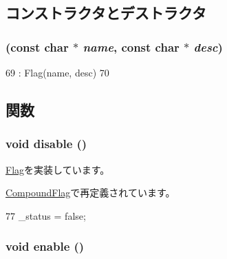 \subsection{コンストラクタとデストラクタ}
\hypertarget{classDebug_1_1SimpleFlag_a8a90f1268b2771315497edeecc402040}{
\subsubsection[{SimpleFlag}]{ (const char $\ast$ {\em name}, \/  const char $\ast$ {\em desc})}}
\label{classDebug_1_1SimpleFlag_a8a90f1268b2771315497edeecc402040}



\begin{DoxyCode}
69         : Flag(name, desc)
70     { }
\end{DoxyCode}


\subsection{関数}
\hypertarget{classDebug_1_1SimpleFlag_a8cfbbe53c1cf6e3054736daea3044c0f}{
\subsubsection[{disable}]{\setlength{\rightskip}{0pt plus 5cm}void disable ()}}
\label{classDebug_1_1SimpleFlag_a8cfbbe53c1cf6e3054736daea3044c0f}


\hyperlink{classDebug_1_1Flag_ac79a817a699d8fb54e52bf6895db1b0d}{Flag}を実装しています。

\hyperlink{classDebug_1_1CompoundFlag_a8cfbbe53c1cf6e3054736daea3044c0f}{CompoundFlag}で再定義されています。


\begin{DoxyCode}
77 { _status = false; }
\end{DoxyCode}
\hypertarget{classDebug_1_1SimpleFlag_a486f22824bd83c5308a0d70ffac6f758}{
\subsubsection[{enable}]{\setlength{\rightskip}{0pt plus 5cm}void enable ()}}
\label{classDebug_1_1SimpleFlag_a486f22824bd83c5308a0d70ffac6f758}


